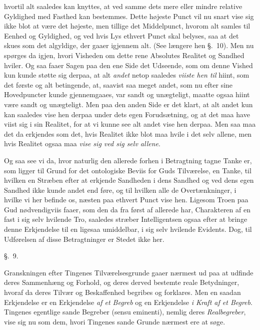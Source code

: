 \documentclass[12pt,a4paper]{book}
\newcommand{\apage}[1]{\marginnote{\footnotesize\textit{[#1]}}}
\begin{document}
hvortil alt saaledes kan knyttes, at ved samme dets mere eller mindre relative
Gyldighed med Fasthed kan bestemmes. Dette højeste Punct vil nu snart vise sig
ikke blot at være det højeste, men tillige det Middelpunct, hvorom alt samles til
Eenhed og Gyldighed, og ved hvis Lys ethvert Punct skal belyses, saa at det skues
som det algyldige, der gaaer igjennem alt. (See længere hen §.~10). Men nu spørges
da igjen, hvori Visheden om dette rene Absolutes Realitet og Sandhed hviler. Og
saa faaer Sagen paa den ene Side det Udseende, som om denne Vished kun kunde
støtte sig derpaa, at alt \emph{andet} netop saaledes \emph{viiste hen til} hiint,
som det første og alt betingende, at, saavist saa meget andet, som nu efter sine
Hovedpuncter kunde gjennemgaaes, var sandt og unægteligt, maatte ogsaa hiint være
sandt og unægteligt. Men paa den anden Side er det klart, at alt andet kun kan
saaledes vise hen derpaa under dets egen Forudsætning, og at det maa have viist
sig i sin Realitet, for at vi kunne see alt andet vise hen derpaa. Men saa maa det
da erkjendes som det, hvis Realitet ikke blot maa hvile i det selv allene, men
hvis Realitet ogsaa maa \emph{vise sig ved sig selv allene}.

Og saa see vi da, hvor naturlig den allerede forhen i Betragtning tagne Tanke er,
som ligger  \apage{88} til Grund for det ontologiske Beviis for Guds Tilværelse, en Tanke,
til hvilken en Stræben efter at erkjende Sandheden i dens Sandhed og ved dens egen
Sandhed ikke kunde andet end føre, og til hvilken alle de Overtænkninger, i
hvilke vi her befinde os, næsten paa ethvert Punct vise hen. Ligesom Troen paa
Gud nødvendigviis faaer, som den da fra først af allerede har, Charakteren af en
fast i sig selv hvilende Tro, saaledes stræber Intelligentsen ogsaa efter at
bringe denne Erkjendelse til en ligesaa umiddelbar, i sig selv hvilende Evidents.
Dog, til Udførelsen af disse Betragtninger er Stedet ikke her.

\begin{center}\large\S.~9.\end{center}

Granskningen efter Tingenes Tilværelsesgrunde gaaer nærmest ud paa at udfinde
deres Sammenhæng og Forhold, og deres derved bestemte reale Betydninger, hvoraf
da deres Tilvær og Beskaffenhed begribes og forklares. Men en saadan Erkjendelse
er en Erkjendelse \emph{af et Begreb} og en Erkjendelse \emph{i Kraft af et
Begreb}. Tingenes egentlige sande Begreber (sensu eminenti), nemlig deres
\emph{Realbegreber}, vise sig nu som dem, hvori Tingenes sande Grunde nærmest ere
at søge.
\end{document}
